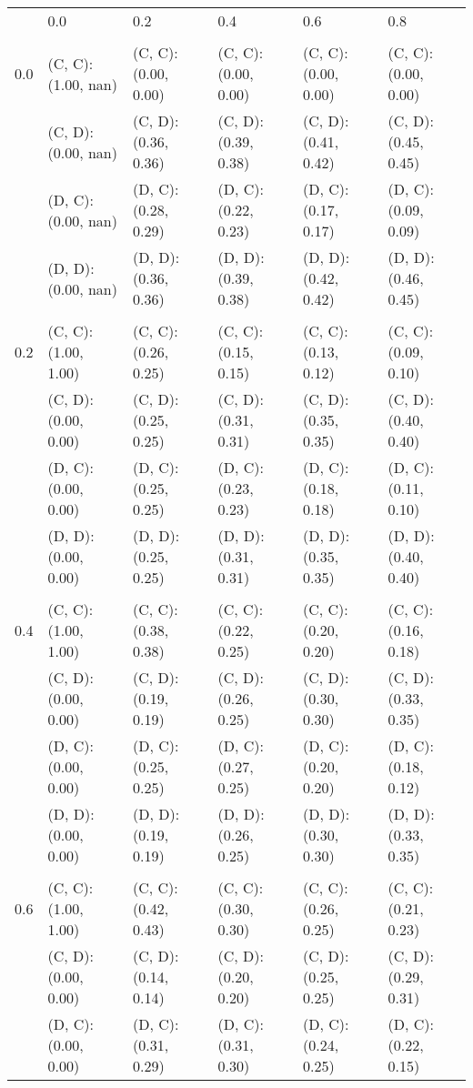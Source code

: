 \begin{tabular}{ l | l l l l l }
& 0.0 & 0.2 & 0.4 & 0.6 & 0.8 \\ 
\\
0.0 & (C, C): (1.00, nan) & (C, C): (0.00, 0.00) & (C, C): (0.00, 0.00) & (C, C): (0.00, 0.00) & (C, C): (0.00, 0.00) \\ 
 & (C, D): (0.00, nan) & (C, D): (0.36, 0.36) & (C, D): (0.39, 0.38) & (C, D): (0.41, 0.42) & (C, D): (0.45, 0.45) \\ 
 & (D, C): (0.00, nan) & (D, C): (0.28, 0.29) & (D, C): (0.22, 0.23) & (D, C): (0.17, 0.17) & (D, C): (0.09, 0.09) \\ 
 & (D, D): (0.00, nan) & (D, D): (0.36, 0.36) & (D, D): (0.39, 0.38) & (D, D): (0.42, 0.42) & (D, D): (0.46, 0.45) \\ 
\\
0.2 & (C, C): (1.00, 1.00) & (C, C): (0.26, 0.25) & (C, C): (0.15, 0.15) & (C, C): (0.13, 0.12) & (C, C): (0.09, 0.10) \\ 
 & (C, D): (0.00, 0.00) & (C, D): (0.25, 0.25) & (C, D): (0.31, 0.31) & (C, D): (0.35, 0.35) & (C, D): (0.40, 0.40) \\ 
 & (D, C): (0.00, 0.00) & (D, C): (0.25, 0.25) & (D, C): (0.23, 0.23) & (D, C): (0.18, 0.18) & (D, C): (0.11, 0.10) \\ 
 & (D, D): (0.00, 0.00) & (D, D): (0.25, 0.25) & (D, D): (0.31, 0.31) & (D, D): (0.35, 0.35) & (D, D): (0.40, 0.40) \\ 
\\
0.4 & (C, C): (1.00, 1.00) & (C, C): (0.38, 0.38) & (C, C): (0.22, 0.25) & (C, C): (0.20, 0.20) & (C, C): (0.16, 0.18) \\ 
 & (C, D): (0.00, 0.00) & (C, D): (0.19, 0.19) & (C, D): (0.26, 0.25) & (C, D): (0.30, 0.30) & (C, D): (0.33, 0.35) \\ 
 & (D, C): (0.00, 0.00) & (D, C): (0.25, 0.25) & (D, C): (0.27, 0.25) & (D, C): (0.20, 0.20) & (D, C): (0.18, 0.12) \\ 
 & (D, D): (0.00, 0.00) & (D, D): (0.19, 0.19) & (D, D): (0.26, 0.25) & (D, D): (0.30, 0.30) & (D, D): (0.33, 0.35) \\ 
\\
0.6 & (C, C): (1.00, 1.00) & (C, C): (0.42, 0.43) & (C, C): (0.30, 0.30) & (C, C): (0.26, 0.25) & (C, C): (0.21, 0.23) \\ 
 & (C, D): (0.00, 0.00) & (C, D): (0.14, 0.14) & (C, D): (0.20, 0.20) & (C, D): (0.25, 0.25) & (C, D): (0.29, 0.31) \\ 
 & (D, C): (0.00, 0.00) & (D, C): (0.31, 0.29) & (D, C): (0.31, 0.30) & (D, C): (0.24, 0.25) & (D, C): (0.22, 0.15) \\ 

\end{tabular}
